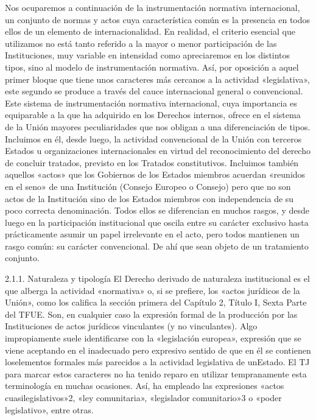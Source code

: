 \documentclass[10pt,a4paper]{article}
\begin{document}
Nos ocuparemos a continuación de la instrumentación normativa internacional, un conjunto de normas y actos cuya característica común es la presencia en todos ellos de un elemento de internacionalidad. En realidad, el criterio esencial que utilizamos no está tanto referido a la mayor o menor participación de las Instituciones, muy variable en intensidad como apreciaremos en los distintos tipos, sino al modelo de instrumentación normativa. Así, por oposición a aquel primer bloque que tiene unos caracteres más cercanos a la actividad «legislativa», este segundo se produce a través del cauce internacional general o convencional. Este sistema de instrumentación normativa internacional, cuya importancia es equiparable a la que ha adquirido en los Derechos internos, ofrece en el sistema de la Unión mayores peculiaridades que nos obligan a una diferenciación de tipos. Incluimos en él, desde luego, la actividad convencional de la Unión con terceros Estados u organizaciones internacionales en virtud del reconocimiento del derecho de concluir tratados, previsto en los Tratados constitutivos. Incluimos también aquellos «actos» que los Gobiernos de los Estados miembros acuerdan «reunidos en el seno» de una Institución (Consejo Europeo o Consejo) pero que no son actos de la Institución sino de los Estados miembros con independencia de su poco correcta denominación. Todos ellos se diferencian en muchos rasgos, y desde luego en la participación institucional que oscila entre su carácter exclusivo hasta prácticamente asumir un papel irrelevante en el acto, pero todos mantienen un rasgo común: su carácter convencional. De ahí que sean objeto de un tratamiento conjunto.



2.1.1. Naturaleza y tipología
El Derecho derivado de naturaleza institucional es el que alberga la actividad «normativa» o, si se prefiere, los «actos jurídicos de la Unión», como los califica la sección primera del Capítulo 2, Título I, Sexta Parte del TFUE. Son, en cualquier caso la expresión formal de la producción por las Instituciones de actos jurídicos vinculantes (y no vinculantes). Algo impropiamente suele identificarse con la «legislación europea», expresión que se viene aceptando en el inadecuado pero expresivo sentido de que en él se contienen loselementos formales más parecidos a la actividad legislativa de unEstado. El TJ para marcar estos caracteres no ha tenido reparo en utilizar tempranamente esta terminología en muchas ocasiones. Así, ha empleado las expresiones «actos cuasilegislativos»2, «ley comunitaria», «legislador comunitario»3 o «poder legislativo», entre otras. 
\end{document}
